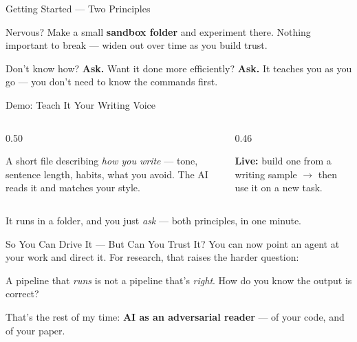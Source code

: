 \documentclass[aspectratio=169, 10pt]{beamer}
\begin{document}
\begin{frame}{Getting Started --- Two Principles}
\vskip6pt
\begin{tcolorbox}[keybox, title={\faFlask\quad 1.\ Build in a ``lab'' folder}, top=3pt, bottom=3pt]
\small Nervous? Make a small \textbf{sandbox folder} and experiment there. Nothing important to break --- widen out over time as you build trust.
\end{tcolorbox}
\vskip8pt
\begin{tcolorbox}[keybox, title={\faQuestionCircle\quad 2.\ Learn by doing --- just ask it}, top=3pt, bottom=3pt]
\small Don't know how? \textbf{Ask.} Want it done more efficiently? \textbf{Ask.} It teaches you as you go --- you don't need to know the commands first.
\end{tcolorbox}
\end{frame}

\begin{frame}{Demo: Teach It Your Writing Voice}
\vskip2pt
\begin{columns}[T]
\begin{column}{0.50\textwidth}
\begin{tcolorbox}[keybox, title={\faMicrophone\quad A ``voice file''}]
\small A short file describing \emph{how you write} --- tone, sentence length, habits, what you avoid. The AI reads it and matches your style.
\end{tcolorbox}
\end{column}
\begin{column}{0.46\textwidth}
\begin{tcolorbox}[accentbox]
\small \textbf{Live:} build one from a writing sample $\rightarrow$ then use it on a new task.
\end{tcolorbox}
\end{column}
\end{columns}
\vskip8pt
\begin{tcolorbox}[quotebox, halign=center, top=3pt, bottom=3pt]
\small It runs in a folder, and you just \emph{ask} --- both principles, in one minute.
\end{tcolorbox}
\end{frame}

\begin{frame}{So You Can Drive It --- But Can You Trust It?}
\vskip4pt
\small You can now point an agent at your work and direct it. For research, that raises the harder question:
\vskip6pt
\begin{tcolorbox}[coralbox, title={\faExclamationTriangle\quad The real question}, top=3pt, bottom=3pt]
\small A pipeline that \emph{runs} is not a pipeline that's \emph{right}. How do you know the output is correct?
\end{tcolorbox}
\vskip8pt
\begin{tcolorbox}[accentbox, halign=center, top=3pt, bottom=3pt]
\small That's the rest of my time: \textbf{AI as an adversarial reader} --- of your code, and of your paper.
\end{tcolorbox}
\end{frame}
\end{document}
